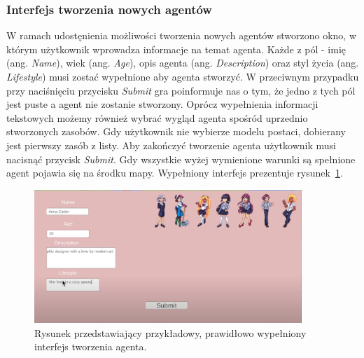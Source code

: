 \subsubsection{Interfejs tworzenia nowych agentów}
W ramach udostęnienia możliwości tworzenia nowych agentów stworzono okno, w którym użytkownik wprowadza informacje na temat agenta. Każde z pól - imię (ang. \textit{Name}), wiek (ang. \textit{Age}), opis agenta (ang. \textit{Description}) oraz styl życia (ang. \textit{Lifestyle}) musi zostać wypełnione aby agenta stworzyć. W przeciwnym przypadku przy naciśnięciu przycisku \textit{Submit} gra poinformuje nas o tym, że jedno z tych pól jest puste a agent nie zostanie stworzony. Oprócz wypełnienia informacji tekstowych możemy również wybrać wygląd agenta spośród uprzednio stworzonych zasobów. Gdy użytkownik nie wybierze modelu postaci, dobierany jest pierwszy zasób z listy. Aby zakończyć tworzenie agenta użytkownik musi nacisnąć przycisk \textit{Submit}. Gdy wszystkie wyżej wymienione warunki są spełnione agent pojawia się na środku mapy.
Wypełniony interfejs prezentuje rysunek~\ref{fig:createagent}.
\begin{figure}[htbp]
    \centering
    \includegraphics[width=0.9\textwidth]{images/411.png}
    \caption{Rysunek przedstawiający przykładowy, prawidłowo wypełniony interfejs tworzenia agenta.}
    \label{fig:createagent}
\end{figure}
